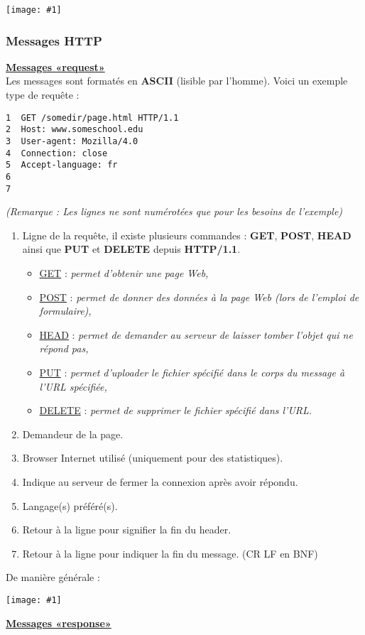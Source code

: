 \documentclass{article}
\newcommand{\ora}[1]{\textcolor{darko}{#1}}
\newcommand{\imgR}[2]{\begin{center}\texttt{[image: \#1]}\end{center}}
\newcommand{\point}[2]{\item \ora{\underline{#1}} : \textit{#2}}
\begin{document}
\imgR{CN_015.png}{300}

\subsubsection{Messages HTTP}

\textbf{\underline{Messages «request»}} \\

\noindent Les messages sont formatés en \textbf{ASCII} (lisible par l'homme). Voici un exemple type de 
requête : 
\begin{lstlisting}
1  GET /somedir/page.html HTTP/1.1
2  Host: www.someschool.edu
3  User-agent: Mozilla/4.0
4  Connection: close
5  Accept-language: fr
6  
7  
\end{lstlisting}
\textit{(Remarque : Les lignes ne sont numérotées que pour les besoins de l'exemple)}

\begin{enumerate}
\item Ligne de la requête, il existe plusieurs commandes : \textbf{GET}, \textbf{POST}, \textbf{HEAD} ainsi 
que \textbf{PUT} et \textbf{DELETE} depuis \textbf{HTTP/1.1}. 
\begin{itemize}
\point{GET}{permet d'obtenir une page Web,}
\point{POST}{permet de donner des données à la page Web (lors de l'emploi de formulaire),}
\point{HEAD}{permet de demander au serveur de laisser tomber l'objet qui ne répond pas,}
\point{PUT}{permet d'uploader le fichier spécifié dans le corps du message à l'URL spécifiée,}
\point{DELETE}{permet de supprimer le fichier spécifié dans l'URL.}
\end{itemize}
\item Demandeur de la page.
\item Browser Internet utilisé (uniquement pour des statistiques).
\item Indique au serveur de fermer la connexion après avoir répondu.
\item Langage(s) préféré(s).
\item Retour à la ligne pour signifier la fin du header.
\item Retour à la ligne pour indiquer la fin du message. (CR LF en BNF)
\end{enumerate}

\newpage
De manière générale : \\
\imgR{CN_016.png}{350}

\textbf{\underline{Messages «response»}} \\
\end{document}
